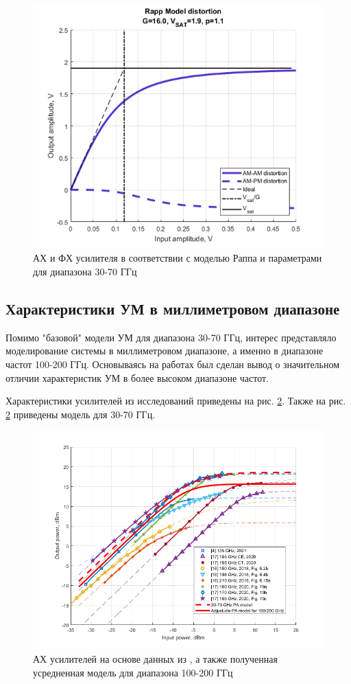 \begin{figure}[h!]
    \centering
    \includegraphics[width=0.7\linewidth]{figs/rapp_nokia.png}
    \caption{АХ и ФХ усилителя в соответствии с моделью Раппа и
    параметрами для диапазона 30-70 ГГц}
    \label{fig:rapp_nokia}
\end{figure}

\subsection{Характеристики УМ в миллиметровом диапазоне}
Помимо "базовой" модели УМ для диапазона 30-70 ГГц, интерес представляло
моделирование системы в миллиметровом диапазоне, а именно  в диапазоне
частот 100-200 ГГц. Основываясь на работах
\cite{zhang2021}\cite{amadorey2018}\cite{aliyun2020} был сделан вывод о
значительном отличии характеристик УМ в более высоком диапазоне частот.

Характеристики усилителей из исследований приведены на рис.
\ref{fig:pa_research_mean}. Также на рис. \ref{fig:pa_research_mean}
приведены модель для 30-70 ГГц.
\begin{figure}[h]
    \centering
    \includegraphics[width=0.7\linewidth]{figs/pa100mean.png}
    \caption{АХ усилителей на основе данных из
    \cite{zhang2021}\cite{amadorey2018}\cite{aliyun2020}, а также
    полученная усредненная модель для диапазона 100-200 ГГц}
    \label{fig:pa_research_mean}
\end{figure}

